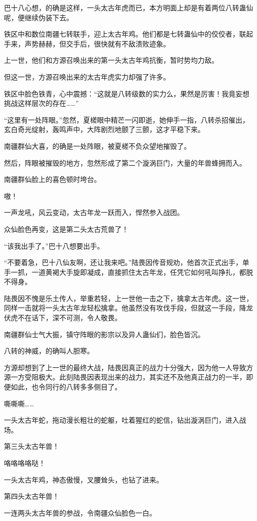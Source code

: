 \begin{this_body}
巴十八心想，的确是这样，一头太古年虎而已，本方明面上却是有着两位八转蛊仙呢，便继续伪装下去。

铁区中和数位南疆七转联手，迎上太古年鸡。他们都是七转蛊仙中的佼佼者，联起手来，声势赫赫，但交手后，很快就有不敌溃败迹象。

上一世，他们和方源召唤出来的第一头太古年鸡抗衡，暂时势均力敌。

但这一世，方源召唤出来的太古年虎实力却强了许多。

铁区中脸色铁青，心中震撼：“这就是八转级数的实力么，果然是厉害！我竟妄想挑战这样层次的存在……”

“这里有一处阵眼。”忽然，夏槎眼中精芒一闪即逝，她伸手一指，八转杀招催出，玄白奇光绽射，轰鸣声中，大阵剧烈地颤了三颤，这才平稳下来。

南疆群仙大喜，的确是一处阵眼，被夏槎不负众望地摧毁了。

然后，阵眼被摧毁的地方，忽然形成了第二个漩涡巨门，大量的年兽蜂拥而入。

南疆群仙脸上的喜色顿时垮台。

嗷！

一声龙吼，风云变动，太古年龙一跃而入，悍然参入战团。

众仙脸色再变，这是第二头太古荒兽了！

“该我出手了。”巴十八想要出手。

“不要着急，巴十八仙友啊，还让我来吧。”陆畏因传音规劝，他首次正式出手，单手一抓，一道黄褐大手旋即凝成，直接抓住太古年龙，任凭它如何吼叫挣扎，都脱不得身。

陆畏因不愧是乐土传人，举重若轻，上一世他一击之下，擒拿太古年虎。这一世，同样一击就将一头太古年龙轻松擒拿。他虽然没有攻伐手段，但就这一手段，降龙伏虎不在话下，深不可测，令人敬畏。

南疆群仙士气大振，镇守阵眼的影宗以及异人蛊仙们，脸色皆沉。

八转的神威，的确叫人胆寒。

方源却想到了上一世的最终大战，陆畏因真正的战力十分强大，因为他一人导致方源一方受阻极大。此刻陆畏因表现出来的战力，其实还不及他真正战力的一半，即便如此，也令同行的八转多多侧目了。

嘶嘶嘶……

一头太古年蛇，拖动漫长粗壮的蛇躯，吐着猩红的蛇信，钻出漩涡巨门，进入战场。

第三头太古年兽！

咯咯咯咯哒！

一头太古年鸡，神态傲慢，叉腰耸头，也钻了进来。

第四头太古年兽！

一连两头太古年兽的参战，令南疆众仙脸色一白。


\end{this_body}
